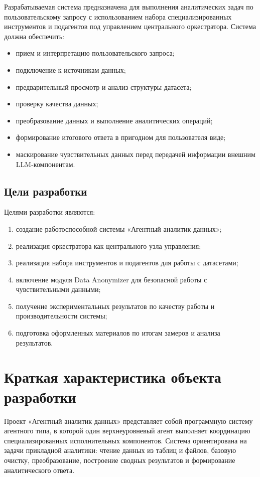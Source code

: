 \documentclass[14pt,a4paper]{extarticle}
\begin{document}
Разрабатываемая система предназначена для выполнения аналитических задач по пользовательскому запросу с использованием набора специализированных инструментов и подагентов под управлением центрального оркестратора. Система должна обеспечить:
\begin{itemize}
    \item прием и интерпретацию пользовательского запроса;
    \item подключение к источникам данных;
    \item предварительный просмотр и анализ структуры датасета;
    \item проверку качества данных;
    \item преобразование данных и выполнение аналитических операций;
    \item формирование итогового ответа в пригодном для пользователя виде;
    \item маскирование чувствительных данных перед передачей информации внешним LLM-компонентам.
\end{itemize}

\subsection{Цели разработки}

Целями разработки являются:
\begin{enumerate}
    \item создание работоспособной системы «Агентный аналитик данных»;
    \item реализация оркестратора как центрального узла управления;
    \item реализация набора инструментов и подагентов для работы с датасетами;
    \item включение модуля Data Anonymizer для безопасной работы с чувствительными данными;
    \item получение экспериментальных результатов по качеству работы и производительности системы;
    \item подготовка оформленных материалов по итогам замеров и анализа результатов.
\end{enumerate}

\section{Краткая характеристика объекта разработки}

Проект «Агентный аналитик данных» представляет собой программную систему агентного типа, в которой один верхнеуровневый агент выполняет координацию специализированных исполнительных компонентов. Система ориентирована на задачи прикладной аналитики: чтение данных из таблиц и файлов, базовую очистку, преобразование, построение сводных результатов и формирование аналитического ответа.
\end{document}
